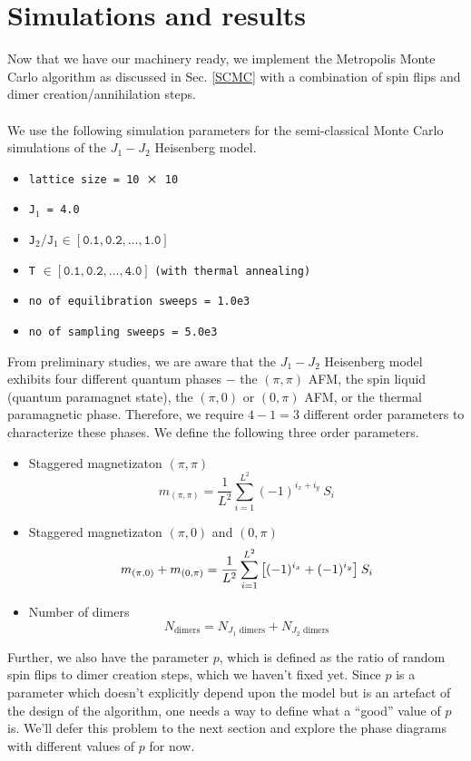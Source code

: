 \documentclass[../thesis_main.tex]{subfiles}
\begin{document}
\section{Simulations and results}
Now that we have our machinery ready, we implement the Metropolis Monte Carlo algorithm as discussed in Sec. \ref{SCMC} with a combination of spin flips and dimer creation/annihilation steps.~\\~\\
We use the following simulation parameters for the semi-classical Monte Carlo simulations of the $J_1-J_2$ Heisenberg model.
\begin{itemize}[label={}] 
    \setlength{\itemsep}{0.1em}   
    \item \texttt{lattice size = 10 $\cross$ 10}
    \item \texttt{J${}_1$ = 4.0}
    \item \texttt{J${}_2/\texttt{J}_1 \in [\texttt{0.1}, \texttt{0.2}, \ldots, \texttt{1.0}]$ }
    \item \texttt{T} $\in [\texttt{0.1}, \texttt{0.2}, \ldots, \texttt{4.0}]$ \texttt{(with thermal annealing)}
    \item \texttt{no of equilibration sweeps = 1.0e3}
    \item \texttt{no of sampling sweeps = 5.0e3}
\end{itemize}
From preliminary studies, we are aware that the $J_1 - J_2$ Heisenberg model exhibits four different quantum phases $-$ the $(\pi, \pi)$ AFM, the spin liquid (quantum paramagnet state), the $(\pi, 0)$ or $(0, \pi)$ AFM, or the thermal paramagnetic phase. Therefore, we require $4 - 1 = 3$ different order parameters to characterize these phases. We define the following three order parameters.
\begin{itemize}
    \setlength{\itemsep}{0.1em}   
    \item Staggered magnetizaton $(\pi, \pi)$ 
    \[ 
        m_{(\pi, \pi)} = \frac{1}{L^2} \sum_{i = 1}^{L^2} (-1)^{i_{x} + i_{y}}\: S_i
    \]
    \item Staggered magnetizaton $(\pi, 0)$ and $(0, \pi)$  
    \[ 
        m_{(\pi, 0)} +  m_{(0, \pi)} = \frac{1}{L^2} \sum_{i = 1}^{L^2} \qty[(-1)^{i_{x}} + (-1)^{i_{y}}] \: S_i 
    \]
    \item Number of dimers
    \[
        N_\text{dimers} = N_{J_1 \text{ dimers}} + N_{J_2 \text{ dimers}}
    \]
\end{itemize}
Further, we also have the parameter $p$, which is defined as the ratio of random spin flips to dimer creation steps, which we haven't fixed yet. Since $p$ is a parameter which doesn't explicitly depend upon the model but is an artefact of the design of the algorithm, one needs a way to define what a ``good'' value of $p$ is. We'll defer this problem to the next section and explore the phase diagrams with different values of $p$ for now.
\end{document}
